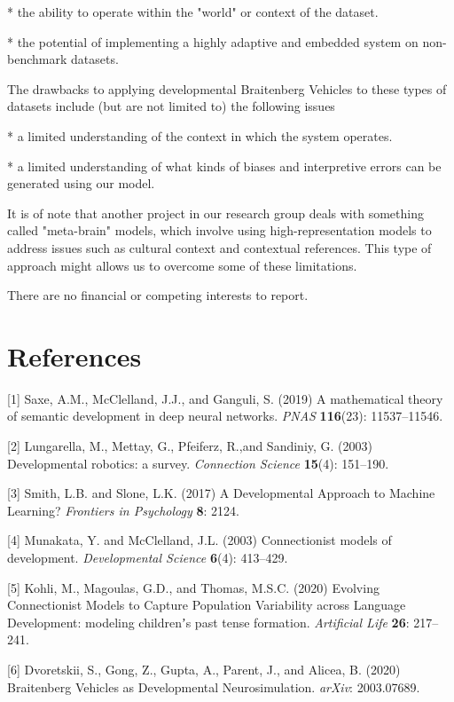 \documentclass{article}
\begin{document}
* the ability to operate within the "world" or context of the dataset.

* the potential of implementing a highly adaptive and embedded system on non-benchmark datasets.

The drawbacks to applying developmental Braitenberg Vehicles to these types of datasets include (but are not limited to) the following issues

* a limited understanding of the context in which the system operates.

* a limited understanding of what kinds of biases and interpretive errors can be generated using our model.

It is of note that another project in our research group deals with something called "meta-brain" models, which involve using high-representation models to address issues such as cultural context and contextual references. This type of approach might allows us to overcome some of these limitations.

\begin{ack}
There are no financial or competing interests to report.
\end{ack}

\section*{References}
\medskip
\small
[1] Saxe, A.M., McClelland, J.J., and Ganguli, S. (2019) A mathematical theory of semantic development in deep neural networks. {\it PNAS} {\bf 116}(23): 11537–11546.

[2] Lungarella, M., Mettay, G., Pfeiferz, R.,and Sandiniy, G. (2003) Developmental robotics: a survey. {\it Connection Science} {\bf 15}(4): 151–190.

[3] Smith, L.B. and Slone, L.K. (2017) A Developmental Approach to Machine Learning? {\it Frontiers in Psychology} {\bf 8}: 2124.

[4] Munakata, Y. and  McClelland, J.L. (2003) Connectionist models of development. {\it Developmental Science} {\bf 6}(4): 413–429.

[5] Kohli, M., Magoulas, G.D., and Thomas, M.S.C. (2020) Evolving Connectionist Models to Capture Population Variability across Language Development: modeling childrenʼs past tense formation. {\it Artificial Life} {\bf 26}: 217–241.

[6] Dvoretskii, S., Gong, Z., Gupta, A., Parent, J., and Alicea, B. (2020) Braitenberg Vehicles as Developmental Neurosimulation. {\it arXiv}: 2003.07689.
\end{document}
